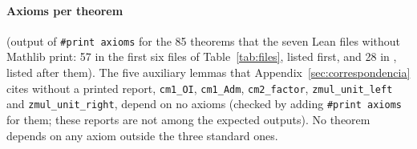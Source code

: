 \paragraph{Axioms per theorem} (output of \texttt{\#print axioms} for the 85 theorems that the seven Lean files without Mathlib print: 57 in the first six files of Table~\ref{tab:files}, listed first, and 28 in , listed after them). The five auxiliary lemmas that Appendix~\ref{sec:correspondencia} cites without a printed report, \texttt{cm1\_OI}, \texttt{cm1\_Adm}, \texttt{cm2\_factor}, \texttt{zmul\_unit\_left} and \texttt{zmul\_unit\_right}, depend on no axioms (checked by adding \texttt{\#print axioms} for them; these reports are not among the expected outputs). No theorem depends on any axiom outside the three standard ones.


